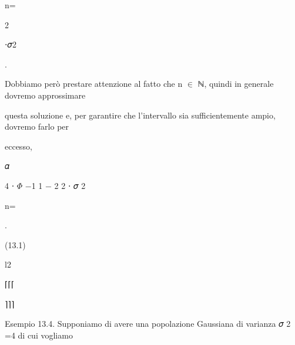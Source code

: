 \documentclass[a4paper,portrait,12pt]{article}
\begin{document}
\begin{flushleft}
n=
\end{flushleft}





2





\begin{flushleft}
⋅𝜎2
\end{flushleft}





.





\begin{flushleft}
Dobbiamo per\`{o} prestare attenzione al fatto che n $\in$ ℕ, quindi in generale dovremo approssimare
\end{flushleft}


\begin{flushleft}
questa soluzione e, per garantire che l'intervallo sia sufficientemente ampio, dovremo farlo per
\end{flushleft}


\begin{flushleft}
eccesso,
\end{flushleft}


\begin{flushleft}
𝛼
\end{flushleft}


\begin{flushleft}
4 ⋅ $\Phi$ $-$1 1 $-$ 2 2 ⋅ 𝜎 2
\end{flushleft}


\begin{flushleft}
n=
\end{flushleft}


.


(13.1)


\begin{flushleft}
l2
\end{flushleft}





⌈⌈⌈





⌉⌉⌉





\begin{flushleft}
Esempio 13.4. Supponiamo di avere una popolazione Gaussiana di varianza 𝜎 2 =4 di cui vogliamo
\end{flushleft}
\end{document}
